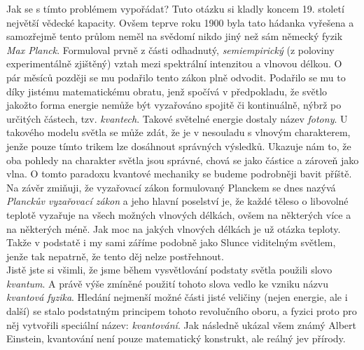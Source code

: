 \documentclass{../../../../style/mkimain}
\begin{document}
Jak se s tímto problémem vypořádat? Tuto otázku si kladly koncem 19. století největší vědecké kapacity.
Ovšem teprve roku 1900 byla tato hádanka vyřešena a samozřejmě tento průlom neměl na svědomí nikdo jiný než sám německý fyzik \textit{Max Planck}.
Formuloval prvně z části odhadnutý, \textit{semiempirický} (z poloviny experimentálně zjištěný) vztah mezi spektrální intenzitou a vlnovou délkou.
O pár měsíců později se mu podařilo tento zákon plně odvodit.
Podařilo se mu to díky jistému matematickému obratu, jenž spočívá v předpokladu,
že světlo jakožto forma energie nemůže být vyzařováno spojitě či kontinuálně, nýbrž po určitých částech, tzv. \textit{kvantech}.
Takové  světelné energie dostaly název \textit{fotony}.
U takového modelu světla se může zdát, že je v nesouladu s vlnovým charakterem, jenže pouze tímto trikem lze dosáhnout správných výsledků.
Ukazuje nám to, že oba pohledy na charakter světla jsou správné, chová se jako částice a zároveň jako vlna.
O tomto paradoxu kvantové mechaniky se budeme podrobněji bavit příště. Na závěr zmiňuji,
že vyzařovací zákon formulovaný Planckem se dnes nazývá \textit{Planckův vyzařovací zákon} a jeho hlavní poselství je,
že každé těleso o libovolné teplotě vyzařuje na všech možných vlnových délkách, ovšem na některých více a na některých méně.
Jak moc na jakých vlnových délkách je už otázka teploty. Takže v podstatě i my sami záříme podobně jako Slunce viditelným světlem,
jenže tak nepatrně, že tento děj nelze postřehnout.
\\

Jistě jste si všimli, že jsme během vysvětlování podstaty světla použili slovo \textit{kvantum}.
A právě výše zmíněné použití tohoto slova vedlo ke vzniku názvu \textit{kvantová fyzika}.
Hledání nejmenší možné části jisté veličiny (nejen energie, ale i další) se stalo podstatným principem tohoto revolučního oboru,
a fyzici proto pro něj vytvořili speciální název: \textit{kvantování}.
Jak následně ukázal všem známý Albert Einstein, kvantování není pouze matematický konstrukt, ale reálný jev přírody.
\end{document}
